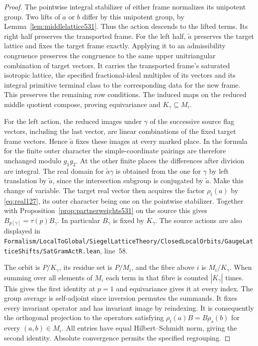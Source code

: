 \documentclass[a4paper,11pt]{article}
\theoremstyle{definition}
\theoremstyle{remark}
\newcommand{\srcloc}[2]{{\small\nolinkurl{#1.lean}}, line~#2}
\numberwithin{equation}{section}
\begin{document}
\begin{proof}
The pointwise integral stabilizer of either frame normalizes its
unipotent group. Two lifts of \(a\) or \(b\) differ by this
unipotent group, by Lemma~\ref{lem:middlelattice531}. Thus the
action descends to the lifted terms. Its right half preserves
the transported frame. For the left half, \(\tilde a\) preserves
the target lattice and fixes the target frame exactly. Applying
it to an admissibility congruence preserves the congruence to
the same upper unitriangular combination of target vectors.
It carries the transported frame's saturated isotropic lattice,
the specified fractional-ideal multiples of its vectors and its
integral primitive terminal class to the corresponding data for
the new frame. This preserves the remaining row conditions.
The induced maps on the reduced middle quotient compose, proving
equivariance and \(K_\gamma\subseteq M_i\).

For the left action, the reduced images under \(\gamma\) of the
successive source flag vectors, including the last vector, are
linear combinations of the fixed target frame vectors. Hence
\(\tilde a\) fixes these images at every marked place. In the
formula for the finite outer character the simple-coordinate
pairings are therefore unchanged modulo \(g_1g_2\). At the
other finite places the differences after division are integral.
The real domain for \(\tilde a\gamma\) is obtained from the one
for \(\gamma\) by left translation by \(\tilde a\), since the
intersection subgroup is conjugated by \(\tilde a\). Make this
change of variable. The target real vector then acquires the
factor \(\rho_t(a)\) by \eqref{eq:real127}, its outer character
being one on the pointwise stabilizer. Together with
Proposition~\ref{prop:partnerweights531} on the source this
gives \(B_{p[\gamma]}=\tau(p)B_\gamma\).
In particular \(B_\gamma\) is fixed by \(K_\gamma\).
The source actions are also displayed in
\srcloc{Formalism/LocalToGlobal/SiegelLatticeTheory/ClosedLocalOrbits/GaugeLatticeShifts/SatGramActR}{58}.

The orbit is \(P/K_\gamma\), its residue set is \(P/M_i\),
and the fibre above \(i\) is \(M_i/K_\gamma\). When summing
over all elements of \(M_i\) each term in that fibre is counted
\(|K_\gamma|\) times. This gives the first identity at \(p=1\)
and equivariance gives it at every index. The group average is
self-adjoint since inversion permutes the summands. It fixes
every invariant operator and has invariant image by reindexing.
It is consequently the orthogonal projection to the operators
satisfying \(\rho_t(a)B=B\rho_s(b)\) for every \((a,b)\in M_i\).
All entries have equal Hilbert--Schmidt norm, giving the second
identity. Absolute convergence permits the specified regrouping.
\end{proof}
\end{document}
